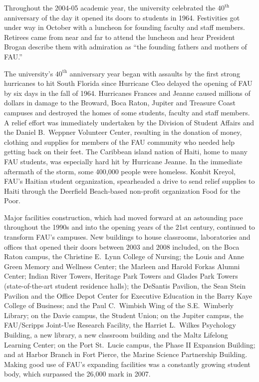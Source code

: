 \documentclass[phd, 12pt, print]{fauthesis}
\begin{document}
Throughout the 2004-05 academic year, the university celebrated the $40^{\mathrm{th}}$ anniversary of the day it opened its doors to students in 1964.  Festivities got under way in October with a luncheon for founding faculty and staff members.  Retirees came from near and far to attend the luncheon and hear President Brogan describe them with admiration as ``the founding fathers and mothers of FAU.''

The university's $40^{\mathrm{th}}$ anniversary year began with assaults by the first strong hurricanes to hit South Florida since Hurricane Cleo delayed the opening of FAU by six days in the fall of 1964.  Hurricanes Frances and Jeanne caused millions of dollars in damage to the Broward, Boca Raton, Jupiter and Treasure Coast campuses and destroyed the homes of some students, faculty and staff members.  A relief effort was immediately undertaken by the Division of Student Affairs and the Daniel B.\ Weppner Volunteer Center, resulting in the donation of money, clothing and supplies for members of the FAU community who needed help getting back on their feet.  The Caribbean island nation of Haiti, home to many FAU students, was especially hard hit by Hurricane Jeanne.  In the immediate aftermath of the storm, some 400,000 people were homeless.  Konbit Kreyol, FAU's Haitian student organization, spearheaded a drive to send relief supplies to Haiti through the Deerfield Beach-based non-profit organization Food for the Poor.

Major facilities construction, which had moved forward at an astounding pace throughout the 1990s and into the opening years of the 21st century, continued to transform FAU's campuses.  New buildings to house classrooms, laboratories and offices that opened their doors between 2003 and 2008 included, on the Boca Raton campus, the Christine E.\ Lynn College of Nursing; the Louis and Anne Green Memory and Wellness Center; the Marleen and Harold Forkas Alumni Center; Indian River Towers, Heritage Park Towers and Glades Park Towers (state-of-the-art student residence halls); the DeSantis Pavilion, the Sean Stein Pavilion and the Office Depot Center for Executive Education in the Barry Kaye College of Business; and the Paul C.\ Wimbish Wing of the S.E.\ Wimberly Library; on the Davie campus, the Student Union; on the Jupiter campus, the FAU/Scripps Joint-Use Research Facility, the Harriet L.\ Wilkes Psychology Building, a new library, a new classroom building and the Maltz Lifelong Learning Center; on the Port St.\ Lucie campus, the Phase II Expansion Building; and at Harbor Branch in Fort Pierce, the Marine Science Partnership Building.  Making good use of FAU's expanding facilities was a constantly growing student body, which surpassed the 26,000 mark in 2007.
\end{document}
